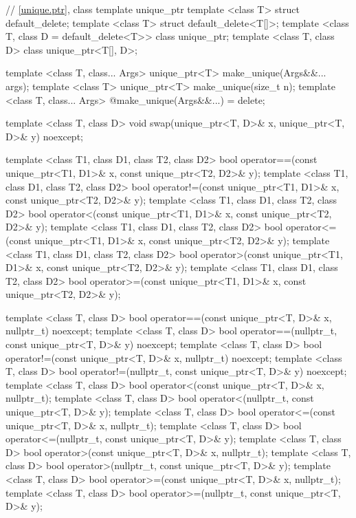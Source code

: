 \begin{codeblock}
{  // \ref{unique.ptr}, class template unique_ptr
  template <class T> struct default_delete;
  template <class T> struct default_delete<T[]>;
  template <class T, class D = default_delete<T>> class unique_ptr;
  template <class T, class D> class unique_ptr<T[], D>;

  template <class T, class... Args> unique_ptr<T> make_unique(Args&&... args);
  template <class T> unique_ptr<T> make_unique(size_t n);
  template <class T, class... Args> @\unspec@ make_unique(Args&&...) = delete;

  template <class T, class D> void swap(unique_ptr<T, D>& x, unique_ptr<T, D>& y) noexcept;

  template <class T1, class D1, class T2, class D2>
    bool operator==(const unique_ptr<T1, D1>& x, const unique_ptr<T2, D2>& y);
  template <class T1, class D1, class T2, class D2>
    bool operator!=(const unique_ptr<T1, D1>& x, const unique_ptr<T2, D2>& y);
  template <class T1, class D1, class T2, class D2>
    bool operator<(const unique_ptr<T1, D1>& x, const unique_ptr<T2, D2>& y);
  template <class T1, class D1, class T2, class D2>
    bool operator<=(const unique_ptr<T1, D1>& x, const unique_ptr<T2, D2>& y);
  template <class T1, class D1, class T2, class D2>
    bool operator>(const unique_ptr<T1, D1>& x, const unique_ptr<T2, D2>& y);
  template <class T1, class D1, class T2, class D2>
    bool operator>=(const unique_ptr<T1, D1>& x, const unique_ptr<T2, D2>& y);

  template <class T, class D>
    bool operator==(const unique_ptr<T, D>& x, nullptr_t) noexcept;
  template <class T, class D>
    bool operator==(nullptr_t, const unique_ptr<T, D>& y) noexcept;
  template <class T, class D>
    bool operator!=(const unique_ptr<T, D>& x, nullptr_t) noexcept;
  template <class T, class D>
    bool operator!=(nullptr_t, const unique_ptr<T, D>& y) noexcept;
  template <class T, class D>
    bool operator<(const unique_ptr<T, D>& x, nullptr_t);
  template <class T, class D>
    bool operator<(nullptr_t, const unique_ptr<T, D>& y);
  template <class T, class D>
    bool operator<=(const unique_ptr<T, D>& x, nullptr_t);
  template <class T, class D>
    bool operator<=(nullptr_t, const unique_ptr<T, D>& y);
  template <class T, class D>
    bool operator>(const unique_ptr<T, D>& x, nullptr_t);
  template <class T, class D>
    bool operator>(nullptr_t, const unique_ptr<T, D>& y);
  template <class T, class D>
    bool operator>=(const unique_ptr<T, D>& x, nullptr_t);
  template <class T, class D>
    bool operator>=(nullptr_t, const unique_ptr<T, D>& y);

}
\end{codeblock}
